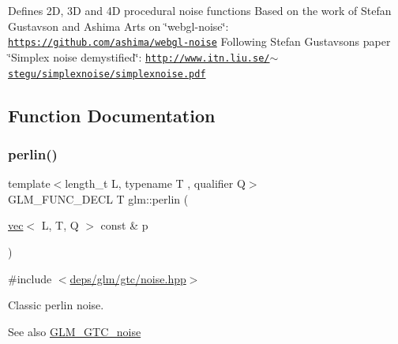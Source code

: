 Defines 2D, 3D and 4D procedural noise functions Based on the work of Stefan Gustavson and Ashima Arts on \char`\"{}webgl-\/noise\char`\"{}\+: \href{https://github.com/ashima/webgl-noise}{\tt https\+://github.\+com/ashima/webgl-\/noise} Following Stefan Gustavson\textquotesingle{}s paper \char`\"{}\+Simplex noise demystified\char`\"{}\+: \href{http://www.itn.liu.se/~stegu/simplexnoise/simplexnoise.pdf}{\tt http\+://www.\+itn.\+liu.\+se/$\sim$stegu/simplexnoise/simplexnoise.\+pdf} 

\subsection{Function Documentation}
\mbox{\label{group__gtc__noise_ga1e043ce3b51510e9bc4469227cefc38a}} 
\subsubsection{\texorpdfstring{perlin()}{perlin()}\hspace{0.1cm}{\footnotesize\ttfamily [1/2]}}
{\footnotesize\ttfamily template$<$length\+\_\+t L, typename T , qualifier Q$>$ \\
G\+L\+M\+\_\+\+F\+U\+N\+C\+\_\+\+D\+E\+CL T glm\+::perlin (\begin{DoxyParamCaption}\item[{\hyperlink{structglm_1_1vec}{vec}$<$ L, T, Q $>$ const \&}]{p }\end{DoxyParamCaption})}



{\ttfamily \#include $<$\hyperlink{noise_8hpp}{deps/glm/gtc/noise.\+hpp}$>$}

Classic perlin noise. \begin{DoxySeeAlso}{See also}
\hyperlink{group__gtc__noise}{G\+L\+M\+\_\+\+G\+T\+C\+\_\+noise} 
\end{DoxySeeAlso}
\mbox{\label{group__gtc__noise_gac270edc54c5fc52f5985a45f940bb103}} 
